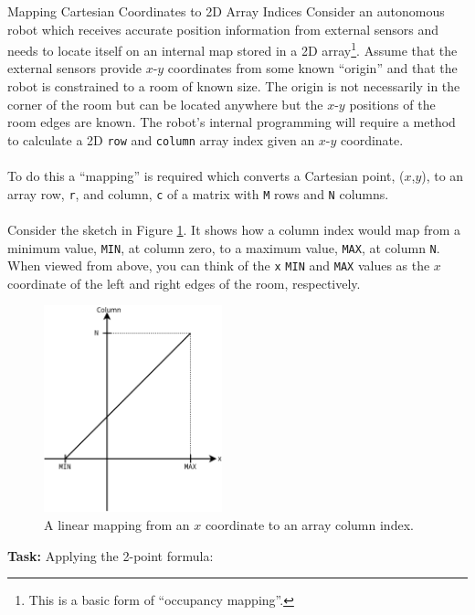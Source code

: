 \documentclass{lab}
\begin{document}
\pagebreak
\begin{task}{Mapping Cartesian Coordinates to 2D Array Indices}{}
Consider an autonomous robot which receives accurate position information from external sensors and needs to locate itself on an internal map stored in a 2D array\footnote{This is a basic form of ``occupancy mapping''.}. Assume that the external sensors provide $x$-$y$ coordinates from some known ``origin'' and that the robot is constrained to a room of known size. The origin is not necessarily in the corner of the room but can be located anywhere but the $x$-$y$ positions of the room edges are known. The robot's internal programming will require a method to calculate a 2D \texttt{row} and \texttt{column} array index given an $x$-$y$ coordinate.
\\~\\
To do this a ``mapping'' is required which converts a Cartesian point, ($x$,$y$), to an array row, \texttt{r}, and column, \texttt{c} of a matrix with \texttt{M} rows and \texttt{N} columns.
\\~\\
Consider the sketch in Figure \ref{fig:mapping}. It shows how a column index would map from a minimum value, \texttt{MIN}, at column zero, to a maximum value, \texttt{MAX}, at column \texttt{N}. When viewed from above, you can think of the \texttt{x} \texttt{MIN} and \texttt{MAX} values as the $x$ coordinate of the left and right edges of the room, respectively.
\begin{figure}[H]
\begin{center}
\includegraphics[width=0.46\textwidth]{mapping.png}
\end{center}
\caption{A linear mapping from an $x$ coordinate to an array column index.}\label{fig:mapping}
\end{figure}
\textbf{Task:} Applying the 2-point formula:
\begin{equation}

\end{equation}
\end{task}
\end{document}
